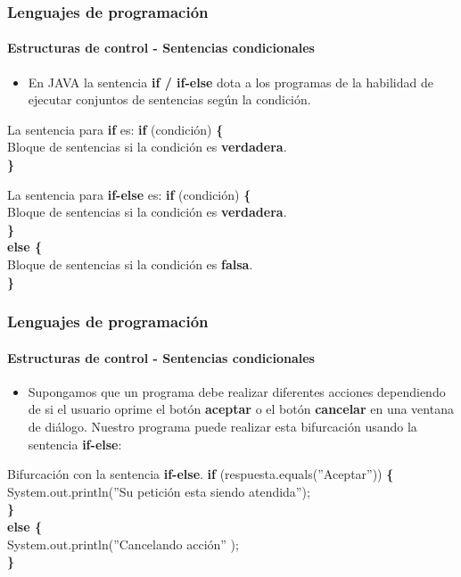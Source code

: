 \documentclass{beamer}
\begin{document}
		\begin{frame}
			\frametitle{Lenguajes de programaci\'on}
			\framesubtitle{Estructuras de control - Sentencias condicionales}

			\begin{itemize}
				\item En JAVA la sentencia \textbf{if / if-else}  dota a los programas de la habilidad de ejecutar conjuntos de sentencias seg\'un la condici\'on.
			\end{itemize}

			\begin{block}{La sentencia para \textbf{if} es:}
			{\scriptsize
				\textbf{if} (condici\'on) \textbf{\{} \\
				\hspace{0.3cm} Bloque de sentencias si la condici\'on es \textbf{verdadera}.  \\
				\textbf{\}}
			}
			\end{block}

			\begin{block}{La sentencia para \textbf{if-else} es:}
			{\scriptsize
				\textbf{if} (condici\'on) \textbf{\{} \\
				\hspace{0.3cm} Bloque de sentencias si la condici\'on es \textbf{verdadera}.  \\
				\textbf{\}}\\
				\textbf{else \{}\\
					\hspace{0.3cm} Bloque de sentencias si la condici\'on es \textbf{falsa}.  \\
				\textbf{\}}
			}
			\end{block}
		\end{frame}

		\begin{frame}
			\frametitle{Lenguajes de programaci\'on}
			\framesubtitle{Estructuras de control - Sentencias condicionales}

			\begin{itemize}
				\item Supongamos que un programa debe realizar diferentes acciones dependiendo de si el usuario oprime el bot\'on \textbf{aceptar} o el bot\'on \textbf{cancelar} en una ventana de di\'alogo. Nuestro programa puede realizar esta bifurcaci\'on usando la sentencia \textbf{if-else}:
			\end{itemize}
			
			\begin{block}{Bifurcaci\'on con la sentencia \textbf{if-else}.}
			{\scriptsize
				\textbf{if} (respuesta.equals(''Aceptar'')) \textbf{\{} \\
				\hspace{0.3cm} System.out.println(''Su petici\'on esta siendo atendida'');  \\
				\textbf{\}}\\
				\textbf{else \{}\\
					\hspace{0.3cm} System.out.println(''Cancelando acci\'on'' );  \\
				\textbf{\}}
			}
			\end{block}
		\end{frame}
\end{document}
